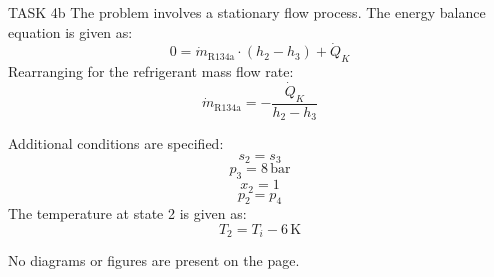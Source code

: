 TASK 4b  
The problem involves a stationary flow process. The energy balance equation is given as:  
\[
0 = \dot{m}_{\text{R134a}} \cdot (h_2 - h_3) + \dot{Q}_K
\]  
Rearranging for the refrigerant mass flow rate:  
\[
\dot{m}_{\text{R134a}} = -\frac{\dot{Q}_K}{h_2 - h_3}
\]  

Additional conditions are specified:  
\[
s_2 = s_3
\]  
\[
p_3 = 8 \, \text{bar}
\]  
\[
x_2 = 1
\]  
\[
p_2 = p_4
\]  
The temperature at state 2 is given as:  
\[
T_2 = T_i - 6 \, \text{K}
\]  

No diagrams or figures are present on the page.
